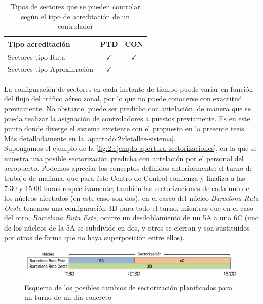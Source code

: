 \begin{table}[h]
	\centering
	\caption[Tipos de sectores según la acreditación del controlador]{Tipos de sectores que se pueden controlar según el tipo de acreditación de un controlador}
	\begin{tabular}{lcc}
		\hline
		\textbf{Tipo acreditación} & \textbf{PTD} & \textbf{CON} \\ \hline
		Sectores tipo Ruta         & $\checkmark$ & $\checkmark$ \\
		Sectores tipo Aproximación & $\checkmark$ &              \\ \hline
	\end{tabular}
	\label{table:2:acreditaciones}
\end{table}
%

La configuración de sectores en cada instante de tiempo puede variar en función del flujo del tráfico aéreo zonal, por lo que no puede conocerse con exactitud previamente. No obstante, puede ser predicho con antelación, de manera que se pueda realizar la asignación de controladores a puestos previamente.
Es en este punto donde diverge el sistema existente con el propuesto en la presente tesis. 
Más detalladamente en la \autoref{apartado:2:detalles-sistema}.
\\

Supongamos el ejemplo de la \autoref{fig:2:ejemplo-apertura-sectorizaciones}, en la que se muestra una posible sectorización predicha con antelación por el personal del aeropuerto. Podemos apreciar los conceptos definidos anteriormente: el turno de trabajo de mañana, que para éste \gls{Centro de Control} comienza y finaliza a las 7:30 y 15:00 horas respectivamente; también las sectorizaciones de cada uno de los núcleos afectados (en este caso son dos), en el casco del núcleo \textit{Barcelona Ruta Oeste} tenemos una configuración 3D para todo el turno, mientras que en el caso del otro, \textit{Barcelona Ruta Este}, ocurre un desdoblamiento de un 5A a una 6C (uno de los núcleos de la 5A se subdivide en dos, y otros se cierran y son sustituidos por otros de forma que no haya superposición entre ellos).

\begin{figure}[htbp]
	\centering
	\includegraphics[width=\linewidth]{ejemplo-apertura-sectorizaciones}
	\caption[Posibles cambios de sectorización planificados para un turno]{Esquema de los posibles cambios de 
	sectorización planificados para un turno de un día concreto}
	\label{fig:2:ejemplo-apertura-sectorizaciones}
\end{figure}

